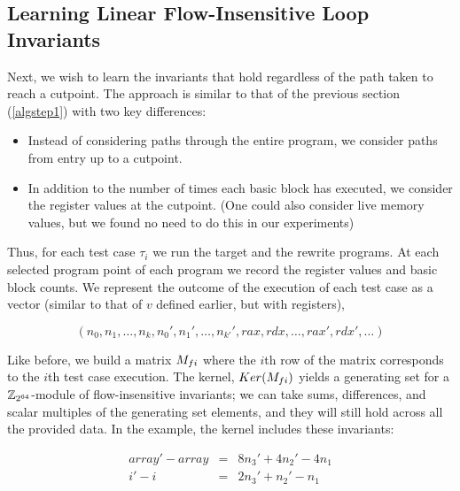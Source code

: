 
\subsection{Learning Linear Flow-Insensitive Loop Invariants} \label{algstep2}

Next, we wish to learn the invariants that hold regardless of the path taken to reach a cutpoint.
The approach is similar to that of the previous section (\ref{algstep1}) with two key differences:

\begin{itemize}
\item Instead of considering paths through the entire program, we
consider paths from entry up to a cutpoint.
\item In addition to the number of times each basic block has
executed, we consider the register values at the cutpoint. (One could
also consider live memory values, but we found no need to do this in
our experiments)
\end{itemize}

Thus, for each test case $\tau_i$ we run the target and the rewrite
programs. At each selected program point of each program we record the
register values and basic block counts. We represent the outcome of
the execution of each test case as a vector (similar to that of $v$ defined earlier, but with registers),

$$\left( n_0, n_1, \dotsc, n_k, n_0', n_1', \dotsc, n_{k'}', rax, rdx, \dotsc, rax', rdx', \dotsc \right)$$

Like before, we build a matrix $M_{fi}$ where the $i$th row of
the matrix corresponds to the $i$th test case execution. The kernel,
$Ker(M_{fi})$ yields a generating set for a $\mathbb{Z}_{2^{64}}$-module
of flow-insensitive invariants; we can take sums, differences, and
scalar multiples of the generating set elements, and they will still
hold across all the provided data. In the example, the kernel includes
these invariants:

\begin{eqnarray*}
array' - array &=& 8n_3' + 4n_2' - 4n_1\\
i'-i &=& 2n_3' + n_2' - n_1\\
\end{eqnarray*}

